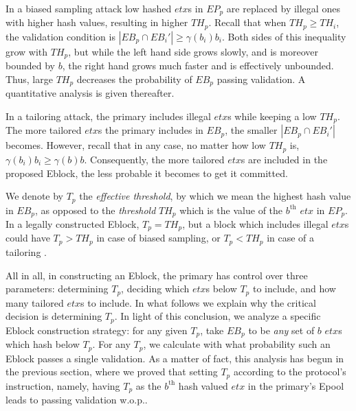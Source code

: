
In a biased sampling attack low hashed $etx$s in $EP_p$ are replaced by illegal ones with higher hash values, resulting in higher $TH_p$. Recall that when $TH_p\ge TH_i$, the validation condition is $|EB_p\cap EB_i'|\ge \gamma(b_i)b_i$. Both sides of this inequality grow with $TH_p$, but while the left hand side grows slowly, and is moreover bounded by $b$, the right hand grows much faster and is effectively unbounded. Thus, large $TH_p$ decreases the probability of $EB_p$ passing validation. A quantitative analysis is given thereafter. 

In a tailoring attack, the primary includes illegal $etx$s while keeping a low $TH_p$. The more tailored $etx$s the primary includes in $EB_p$, the smaller $|EB_p\cap EB_i'|$ becomes. However, recall that in any case, no matter how low $TH_p$ is, $\gamma(b_i)b_i\ge \gamma(b)b$. Consequently, the more tailored $etx$s are included in the proposed Eblock, the less probable it becomes to get it committed. 

We denote by $T_p$ the \textit{effective threshold}, by which we mean the highest hash value in $EB_p$, as opposed to the \textit{threshold} $TH_p$ which is the value of the $b^{\text{th}}$ $etx$ in $EP_p$. In a legally constructed Eblock, $T_p=TH_p$, but a block which includes illegal $etx$s could have $T_p>TH_p$ in case of biased sampling, or $T_p<TH_p$ in case of a tailoring . 

All in all, in constructing an Eblock, the primary has control over three parameters: determining $T_p$, deciding which $etx$s below $T_p$ to include, and how many tailored $etx$s to include. In what follows we explain why the critical decision is determining $T_p$. In light of this conclusion, we analyze a specific Eblock construction strategy: for any given $T_p$, take $EB_p$ to be \textit{any} set of $b$ $etx$s which hash below $T_p$. For any $T_p$, we calculate with what probability such an Eblock passes a single validation. As a matter of fact, this analysis has begun in the previous section, where we proved that setting $T_p$ according to the protocol's instruction, namely, having $T_p$ as the $b^{\text{th}}$ hash valued $etx$ in the primary's Epool leads to passing validation w.o.p.. 

